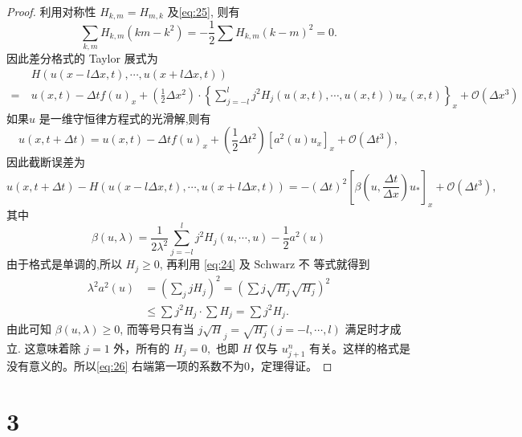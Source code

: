 \documentclass[12pt]{article}
\begin{document}
\begin{proof}
利用对称性 $H_{k, m}=H_{m, k}$ 及\cref{eq:25}, 则有
\begin{equation}
	\sum_{k, m} H_{k, m}(k m-k^{2})=-\frac{1}{2} \sum {H}_{k, m}(k-m)^{2}=0.
\end{equation}
因此差分格式的 Taylor 展式为
\begin{equation}
	\begin{aligned}
		&\ H(u(x-l \Delta x, t), \cdots, u(x+l \Delta x, t)) \\
		=&\ u(x, t)-\Delta t f(u)_{x}+\left(\frac{1}{2} \Delta x^{2}\right)\cdot\left\{\sum_{j=-l}^{l} j^{2} H_{j}(u(x, t), \cdots, u(x, t)) u_{x}(x, t)\right\}_{x}+\mathcal{O}\left(\Delta x^{3}\right)
	\end{aligned}
\end{equation}
如果$u$ 是一维守恒律方程式的光滑解,则有
\begin{equation}
	u(x, t+\Delta t)=u(x, t)-\Delta tf(u)_{x}+\left(\frac{1}{2} \Delta t^{2}\right)\left[a^{2}(u) u_{x}\right]_{x}+\mathcal{O}\left(\Delta t^{3}\right),
\end{equation}
因此截断误差为
\begin{equation}
	u(x, t+\Delta t)-H(u(x-l \Delta x, t), \cdots, u(x+l \Delta x, t))=-(\Delta t)^{2}\left[\beta\left(u, \frac{\Delta t}{\Delta x}\right) u_{*}\right]_{x}+\mathcal{O}\left(\Delta t^{3}\right),
	\label{eq:26}
\end{equation}
其中
\begin{equation}
	\beta(u, \lambda)=\frac{1}{2 \lambda^{2}} \sum_{j=-l}^{l} j^{2} H_{j}(u, \cdots, u)-\frac{1}{2} a^{2}(u)
\end{equation}
由于格式是单调的,所以 $H_{j} \geqslant 0$, 再利用 \cref{eq:24} 及 $\mathrm{Schwarz}$ 不
等式就得到
\begin{equation}
	\begin{aligned}
	\lambda^{2} a^{2}(u) &=\left(\sum_{j} j H_{j}\right)^{2}=\left(\sum j \sqrt{H_{j}} \sqrt{H_{j}}\right)^{2} \\
	& \leqslant \sum j^{2} H_{j} \cdot \sum H_{j}=\sum j^{2} H_{j}.
	\end{aligned}
	\end{equation}
由此可知 $\beta(u, \lambda) \geqslant 0$, 而等号只有当 $j \sqrt{H}_{j}=\sqrt{H_{j}}(j=-l, \cdots,
l)$ 满足时才成立. 这意味着除 $j=1$ 外，所有的 $H_{j}=0,$ 也即 $H$ 仅与 $u_{j+1}^{n}$ 有关。这样的格式是没有意义的。所以\cref{eq:26} 右端第一项的系数不为0，定理得证。


\end{proof}

\section{3}
\end{document}
